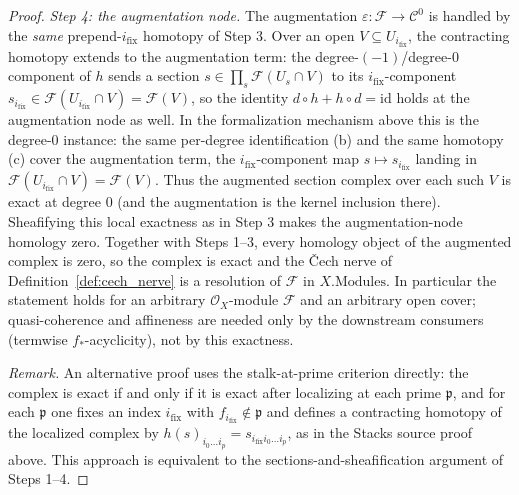 \begin{proof}
  \emph{Step 4: the augmentation node.} The augmentation \(\varepsilon : \mathcal{F} \to
  \mathcal{C}^0\) is handled by the \emph{same} prepend-\(i_{\mathrm{fix}}\) homotopy of Step 3. Over an
  open \(V \subseteq U_{i_{\mathrm{fix}}}\), the contracting homotopy extends to the augmentation term:
  the degree-\((-1)\)/degree-\(0\) component of \(h\) sends a section \(s \in \prod_s \mathcal{F}(U_s
  \cap V)\) to its \(i_{\mathrm{fix}}\)-component \(s_{i_{\mathrm{fix}}} \in \mathcal{F}(U_{i_{\mathrm{fix}}}
  \cap V) = \mathcal{F}(V)\), so the identity \(d \circ h + h \circ d = \mathrm{id}\) holds at the
  augmentation node as well. In the formalization mechanism above this is the degree-\(0\) instance: the
  same per-degree identification (b) and the same homotopy (c) cover the augmentation term, the
  \(i_{\mathrm{fix}}\)-component map \(s \mapsto s_{i_{\mathrm{fix}}}\) landing in
  \(\mathcal{F}(U_{i_{\mathrm{fix}}} \cap V) = \mathcal{F}(V)\). Thus the augmented section complex over each
  such \(V\) is exact at degree
  \(0\) (and the augmentation is the kernel inclusion there). Sheafifying this local exactness as in
  Step 3 makes the augmentation-node homology zero. Together with Steps 1--3, every homology object of
  the augmented complex is zero, so the complex is exact and the {\v C}ech nerve of
  Definition~\ref{def:cech_nerve} is a resolution of \(\mathcal{F}\) in \(X.\mathrm{Modules}\). In
  particular the statement holds for an arbitrary \(\mathcal{O}_X\)-module \(\mathcal{F}\) and an
  arbitrary open cover; quasi-coherence and affineness are needed only by the downstream consumers
  (termwise \(f_*\)-acyclicity), not by this exactness.

  \emph{Remark.} An alternative proof uses the stalk-at-prime criterion directly: the complex is
  exact if and only if it is exact after localizing at each prime \(\mathfrak{p}\), and for each
  \(\mathfrak{p}\) one fixes an index \(i_{\text{fix}}\) with \(f_{i_{\text{fix}}} \notin \mathfrak{p}\)
  and defines a contracting homotopy of the localized complex by
  \(h(s)_{i_0 \ldots i_p} = s_{i_{\text{fix}} i_0 \ldots i_p}\), as in the Stacks source proof above.
  This approach is equivalent to the sections-and-sheafification argument of Steps 1--4.
\end{proof}


